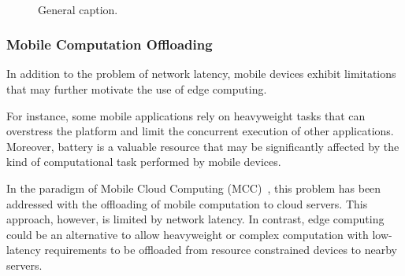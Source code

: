 
\begin{figure}[htbp]
	\centering
	\hfill
	~
	\hfill
	\caption{General caption.} \label{fig:1}
\end{figure}

\subsubsection{Mobile Computation Offloading}

In addition to the problem of network latency, mobile devices exhibit limitations that may further motivate the use of edge computing. 

For instance, some mobile applications rely on heavyweight tasks that can overstress the platform and limit the concurrent execution of other applications. Moreover, battery is a valuable resource that may be significantly affected by the kind of computational task performed by mobile devices. 

In the paradigm of Mobile Cloud Computing (MCC)~\cite{}, this problem has been addressed with the offloading of mobile computation to cloud servers. This approach, however, is limited by network latency. In contrast, edge computing could be an alternative to allow heavyweight or complex computation with low-latency requirements to be offloaded from resource constrained devices to nearby servers.

